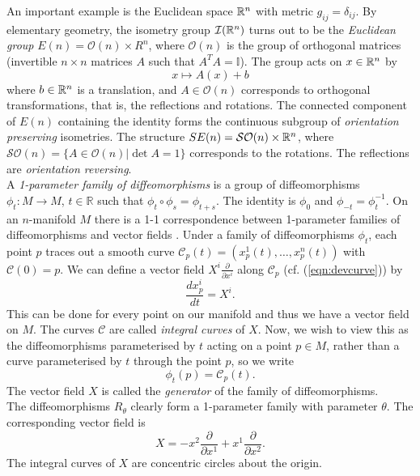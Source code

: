 An important example is the Euclidean space ${\mathbb R}^n$ with metric $g_{ij}=\delta_{ij}$. By elementary geometry, the isometry group $\mathcal{I}({\mathbb R}^n)$ turns out to be the \textit{Euclidean group} $E(n)=\mathcal{O}(n)\times R^n$, where $\mathcal{O}(n)$ is the group of orthogonal matrices (invertible $n\times n$ matrices $A$ such that $A^T A=\mathbb{I}$). The group acts on $x\in {\mathbb R}^n$ by 
\[ x\mapsto A(x) + b \]
where $b \in {\mathbb R}^n$ is a translation, and $A\in \mathcal{O}(n)$ corresponds to orthogonal transformations, that is, the reflections and rotations. The connected component of $E(n)$ containing the identity forms the continuous subgroup of \textit{orientation preserving} isometries. The structure $SE(n)=\mathcal{SO}(n)\times {\mathbb R}^n$, where $\mathcal{SO}(n)=\{A\in \mathcal{O}(n)|\det A=1\}$ corresponds to the rotations. The reflections are \textit{orientation reversing}.\\

A \textit{1-parameter family of diffeomorphisms} is a group of diffeomorphisms $\phi_t:M\rightarrow M$, $t\in \mathbb{R}$ such that $\phi_t \circ \phi_s = \phi_{t+s}$. The identity is $\phi_0$ and $\phi_{-t}=\phi_{t}^{-1}$. On an $n$-manifold $M$ there is a 1-1 correspondence between 1-parameter families of diffeomorphisms and vector fields \cite{Carroll}. Under a family of diffeomorphisms $\phi_t$, each point $p$ traces out a smooth curve $\mathcal{C}_p(t)=(x^1_p(t),\dots,x^n_p(t))$ with $\mathcal{C}(0)=p$. We can define a vector field $X^i \frac{\partial}{\partial x^i}$ along $\mathcal{C}_p$ (cf. (\ref{eqn:devcurve})) by 
\begin{equation} \frac{dx^i_p}{dt}=X^i. \label{eq:intcurve}\end{equation}
This can be done for every point on our manifold and thus we have a vector field on $M$. The curves $\mathcal{C}$ are called \textit{integral curves} of $X$. Now, we wish to view this as the diffeomorphisms parameterised by $t$ acting on a point $p\in M$, rather than a curve parameterised by $t$ through the point $p$, so we write
\[ \phi_t(p)=\mathcal{C}_p(t).\]
The vector field $X$ is called the \textit{generator} of the family of diffeomorphisms. \\

The diffeomorphisms $R_\theta$ clearly form a 1-parameter family with parameter $\theta$. The corresponding vector field is
\begin{equation} X= -x^2 \frac{\partial}{\partial x^1} + x^1 \frac{\partial}{\partial x^2}. \label{eq:Xrz}\end{equation}
The integral curves of $X$ are concentric circles about the origin.\\

